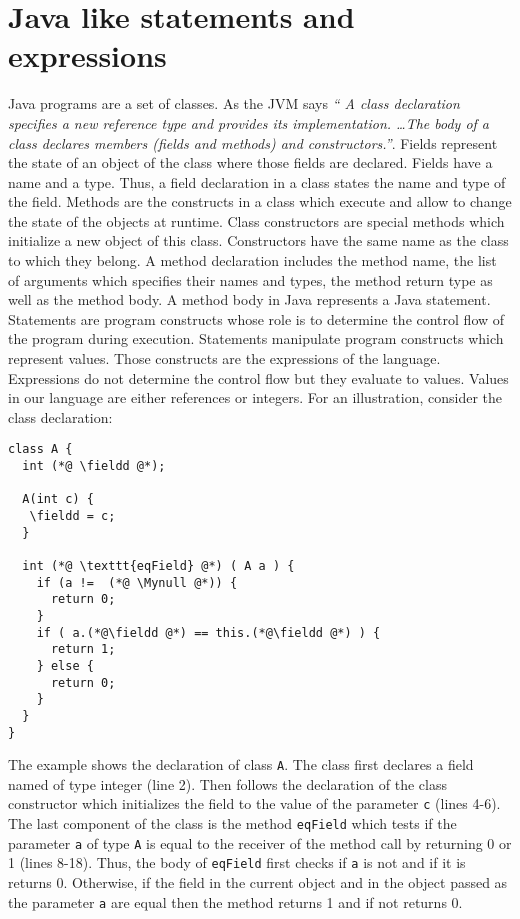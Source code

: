 
\newtheorem{Expression}{Definition}[section]
\newtheorem{ExpressionRel}[Expression]{Definition}
\newtheorem{Statement}[Expression]{Definition}

\section{Java like statements and expressions} \label{source}
 
 Java programs are a set of classes. 
 As the JVM says \textit{`` A class declaration specifies a new reference type and provides its implementation. \ldots The body of a class declares members (fields and methods) and constructors.''}. Fields represent the state of an object of the class where those fields are declared. 
Fields have a name and a type. Thus, a  field declaration in a class states the name and type of the field.
Methods are the constructs in a class which execute and allow to change the state of the objects at runtime.
Class constructors are special methods which  initialize a new object of this class. 
Constructors have the same name as the class to which they belong. 
 A method declaration includes
 the method name, the list of arguments which specifies their names and  types, the method return type as well as the method body.
A method body in Java represents a Java statement. Statements are program constructs whose role is to determine the control flow of the program during execution. 
Statements manipulate program constructs which represent values. Those constructs are the expressions of the language.
Expressions do not determine the control flow but they evaluate to values. Values in our language are either references
 or integers.
For an illustration, consider the class declaration:
\lstset{numbers=left}
\begin{lstlisting}[frame=trbl] 
class A {
  int (*@ \fieldd @*);
  
  A(int c) {
   \fieldd = c;
  }

  int (*@ \texttt{eqField} @*) ( A a ) {
    if (a !=  (*@ \Mynull @*)) {
      return 0;
    }
    if ( a.(*@\fieldd @*) == this.(*@\fieldd @*) ) {
      return 1;
    } else {
      return 0;
    }
  }
}
\end{lstlisting}


The example shows  the declaration of class  \lstinline!A!.
The class first declares a field named \fieldd{} of type integer (line 2).
 Then follows the declaration of the class  constructor which initializes the field \fieldd{} to the value
of the parameter \lstinline!c! (lines 4-6). The last component of the class is the  method \texttt{eqField}
 which tests if the parameter \lstinline!a! of type  \lstinline!A!  is
 equal to the receiver of the method call by returning 0 or 1 (lines 8-18).
 Thus, the body of \texttt{eqField} first checks if  \lstinline!a!
 is not \Mynull{} and if it is returns 0. Otherwise, if the field  \fieldd{} in the current object  and in the object 
passed as the parameter \lstinline!a! are equal then the method returns 1 and if not returns 0. 



